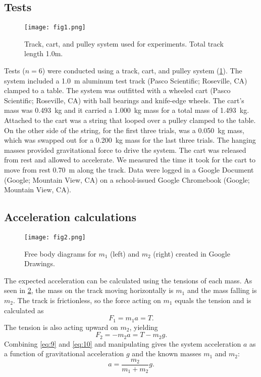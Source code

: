 ﻿\documentclass[reprint,amsmath,amssymb.aps]{revtex4-2}
\begin{document}
\subsection{Tests}
\begin{figure}
\begin{center}
\texttt{[image: fig1.png]}
\end{center}
\caption{Track, cart, and pulley system used for experiments. Total track length 1.0m.}
\label{fig:1}
\end{figure}
Tests ($n=6$) were conducted using a track, cart, and pulley system (\cref{fig:1}). The system included a \qty{1.0}{\meter} aluminum test track (Pasco Scientific; Roseville, CA) clamped to a table. The system was outfitted with a wheeled cart (Pasco Scientific; Roseville, CA) with ball bearings and knife-edge wheels. The cart's mass was \qty{0.493}{\kilo\gram} and it carried a \qty{1.000}{\kilo\gram} mass for a total mass of \qty{1.493}{\kilo\gram}. Attached to the cart was a string that looped over a pulley clamped to the table. On the other side of the string, for the first three trials, was a \qty{0.050}{\kilo\gram} mass, which was swapped out for a \qty{0.200}{\kilo\gram} mass for the last three trials. The hanging masses provided gravitational force to drive the system. The cart was released from rest and allowed to accelerate. We measured the time it took for the cart to move from rest \qty{0.70}{\meter} along the track. Data were logged in a Google Document (Google; Mountain View, CA) on a school-issued Google Chromebook (Google; Mountain View, CA). 

\subsection{Acceleration calculations}
\begin{figure}
\begin{center}
\texttt{[image: fig2.png]}
\end{center}
\caption{Free body diagrams for $m_1$ (left) and $m_2$ (right) created in Google Drawings.}
\label{fig:2}
\end{figure}

The expected acceleration can be calculated using the tensions of each mass. As seen in \cref{fig:2}, the mass on the track moving horizontally is $m_1$ and the mass falling is $m_2$. The track is frictionless, so the force acting on $m_1$ equals the tension and is calculated as
\begin{equation}
F_1 = m_1 a = T.
\label{eq:9}
\end{equation}
The tension is also acting upward on $m_2$, yielding
\begin{equation}
F_2 = -m_2 a = T - m_2 g.
\label{eq:10}
\end{equation}
Combining \cref{eq:9} and \cref{eq:10} and manipulating gives the system acceleration $a$ as a function of gravitational acceleration $g$ and the known masses $m_1$ and $m_2$:
\begin{equation}
a = \dfrac{m_2}{m_1 + m_2} g.
\label{eq:11}
\end{equation}
\end{document}
